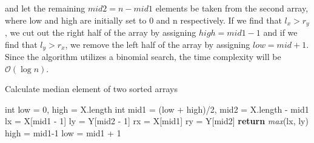     	and let the remaining $ mid2 = n-mid1$ elements be taken from the second array, where low and high are initially set to 0 and n respectively. If we find that $l_x > r_y$, we cut out the right half of the array by assigning $high = mid1 - 1$ and if we find that $l_y > r_x$, we remove the left half of the array by assigning $low = mid + 1$. Since the algorithm utilizes a binomial search, the time complexity will be $\mathcal{O}(\log{}n)$.
    	\begin{algorithm}[H]
    		\caption{Calculate median element of two sorted arrays}
    		\begin{algorithmic}[1]
    			\State int low = 0, high = X.length
	    			\State int mid1 = (low + high)/2, \quad mid2 = X.length - mid1
	    			\State lx = X[mid1 - 1]
	    			\State ly = Y[mid2 - 1]
	    			\State rx = X[mid1]
	    			\State ry = Y[mid2]
	    				\State \textbf{return} \textit{max}(lx, ly)
	    					\State high = mid1-1
	    					\State low = mid1 + 1
	    			\EndIf
    			\EndWhile
    			\EndProcedure
    			
    		\end{algorithmic}
    	\end{algorithm}
